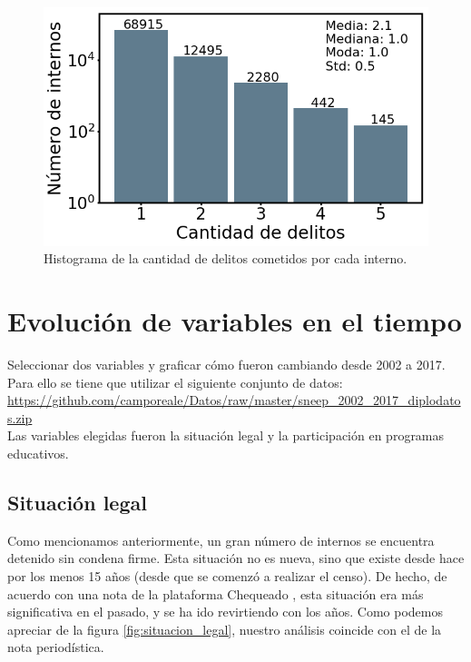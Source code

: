 \documentclass[10pt]{article}
\begin{document}
\begin{figure}[H]
	\centering
	\includegraphics[scale=0.4]{graficos/cantidad_delitos.png}
	\caption{Histograma de la cantidad de delitos cometidos por cada interno. \label{fig:cantidad_delitos}}
\end{figure}

\section{Evolución de variables en el tiempo}

Seleccionar dos variables y graficar cómo fueron cambiando desde 2002 a 2017. Para ello se tiene que utilizar el siguiente conjunto de datos: \url{https://github.com/camporeale/Datos/raw/master/sneep_2002_2017_diplodatos.zip}\\

Las variables elegidas fueron la situación legal y la participación en programas educativos.

\subsection{Situación legal}

Como mencionamos anteriormente, un gran n\'umero de internos se encuentra detenido sin condena firme. Esta situaci\'on no es nueva, sino que existe desde hace por los menos 15 a\~nos (desde que se comenz\'o a realizar el censo). De hecho, de acuerdo con una nota de la plataforma Chequeado \cite{chequeadoCondenados}, esta situaci\'on era m\'as significativa en el pasado, y se ha ido revirtiendo con los a\~nos. Como podemos apreciar de la figura \ref{fig:situacion_legal}, nuestro an\'alisis coincide con el de la nota period\'istica.
\end{document}
